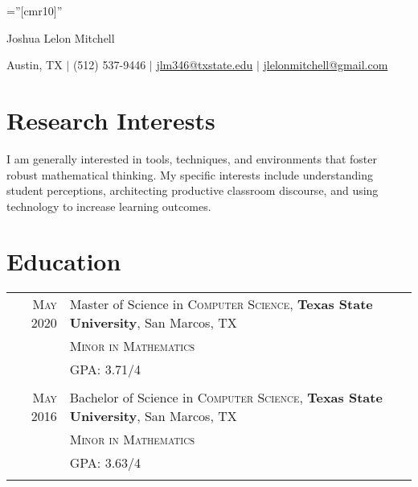 \documentclass[a4paper,10pt]{article}
\begin{document}

\pagestyle{empty} %

\font\fb=''[cmr10]'' %

\par{\centering
		{\Huge Joshua Lelon Mitchell
	}\par}
\par{\centering
		{
	Austin, TX
	$\mid$
	(512) 537-9446
	$\mid$
	\href {mailto:joshua.mitchell@txstate.edu}{jlm346@txstate.edu} $\mid$
	\href {mailto:jlelonmitchell@gmail.com}{jlelonmitchell@gmail.com}
}\par}


\section{Research Interests}

I am generally interested in tools, techniques, and environments that foster robust mathematical thinking. My specific interests include understanding student perceptions, architecting productive classroom discourse, and using technology to increase learning outcomes.
\section{Education}
\begin{tabular}{rl}	
 \textsc{May} 2020 & Master of Science in \textsc{Computer Science}, \textbf{Texas State University}, San Marcos, TX\\
 
&\normalsize \textsc{Minor in Mathematics} \\

&\normalsize \textsc{GPA}: 3.71/4 \\ & \\

\textsc{May} 2016 & Bachelor of Science in \textsc{Computer Science}, \textbf{Texas State University}, San Marcos, TX \\
&\normalsize \textsc{Minor in Mathematics} \\

&\normalsize \textsc{GPA}: 3.63/4 \\&\\
\end{tabular}
\end{document}
